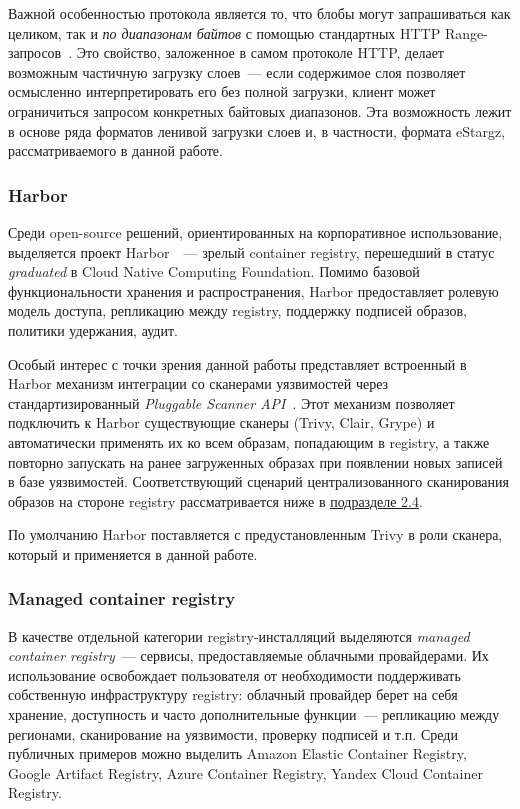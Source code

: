 Важной особенностью протокола является то, что блобы могут запрашиваться как целиком, так и \textit{по диапазонам байтов} с помощью стандартных HTTP Range-запросов~\cite{httprange}. Это свойство, заложенное в самом протоколе HTTP, делает возможным частичную загрузку слоев~--- если содержимое слоя позволяет осмысленно интерпретировать его без полной загрузки, клиент может ограничиться запросом конкретных байтовых диапазонов. Эта возможность лежит в основе ряда форматов ленивой загрузки слоев и, в частности, формата eStargz, рассматриваемого в данной работе.

\subsubsection{Harbor}

Среди open-source решений, ориентированных на корпоративное использование, выделяется проект Harbor~\cite{harbor}~--- зрелый container registry, перешедший в статус \textit{graduated} в Cloud Native Computing Foundation. Помимо базовой функциональности хранения и распространения, Harbor предоставляет ролевую модель доступа, репликацию между registry, поддержку подписей образов, политики удержания, аудит.

Особый интерес с точки зрения данной работы представляет встроенный в Harbor механизм интеграции со сканерами уязвимостей через стандартизированный \textit{Pluggable Scanner API}~\cite{harborscanadapter}. Этот механизм позволяет подключить к Harbor существующие сканеры (Trivy, Clair, Grype) и автоматически применять их ко всем образам, попадающим в registry, а также повторно запускать на ранее загруженных образах при появлении новых записей в базе уязвимостей. Соответствующий сценарий централизованного сканирования образов на стороне registry рассматривается ниже в \hyperref[subsec:scan-lifecycle]{подразделе 2.4}.

По умолчанию Harbor поставляется с предустановленным Trivy в роли сканера, который и применяется в данной работе.

\subsubsection{Managed container registry}

В качестве отдельной категории registry-инсталляций выделяются \textit{managed container registry}~--- сервисы, предоставляемые облачными провайдерами. Их использование освобождает пользователя от необходимости поддерживать собственную инфраструктуру registry: облачный провайдер берет на себя хранение, доступность и часто дополнительные функции~--- репликацию между регионами, сканирование на уязвимости, проверку подписей и т.п. Среди публичных примеров можно выделить Amazon Elastic Container Registry, Google Artifact Registry, Azure Container Registry, Yandex Cloud Container Registry.

